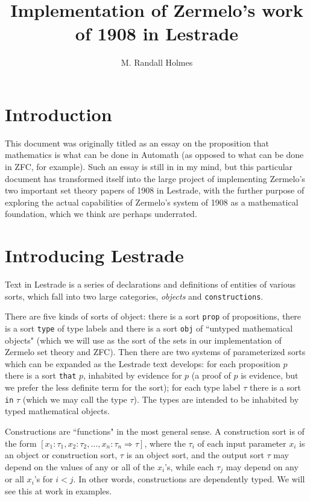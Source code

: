 \documentclass[12pt]{article}
\title{Implementation of Zermelo's work of 1908 in Lestrade}
\author{M. Randall Holmes}
\begin{document}
\maketitle

\section{Introduction}
 
This document was originally titled as an essay on the proposition that mathematics is what can be done in Automath (as opposed to what can be done in ZFC, for example).  Such an essay is still in in my mind, but this particular document has transformed itself into the large project of implementing Zermelo's two important set theory papers of 1908 in Lestrade, with the further purpose of exploring the actual capabilities of Zermelo's system of 1908 as a mathematical foundation, which we think are perhaps underrated.

\section{Introducing Lestrade}

Text in Lestrade is a series of declarations and definitions of entities of various sorts, which fall into two large categories, {\em objects\/} and {\tt constructions\/}.

There are five kinds of sorts of object:  there is a sort {\tt prop} of propositions, there is a sort {\tt type} of type labels and there is a sort {\tt obj} of ``untyped mathematical objects" (which we will use as the sort of the sets in our implementation of Zermelo set theory and ZFC).  Then there are two systems of parameterized sorts which can be expanded as the Lestrade text develops:  for each proposition $p$ there is a sort {\tt that} $p$, inhabited by evidence for $p$ (a proof of $p$ is evidence, but we prefer the less definite term for the sort);  for each type label $\tau$ there is a sort {\tt in} $\tau$ (which we may call the type $\tau$).  The types are intended to be inhabited by typed  mathematical objects.

Constructions are ``functions" in the most general sense.  A construction sort is of the form $[x_1:\tau_1,x_2:\tau_2,\ldots,x_n:\tau_n \Rightarrow \tau]$, where the $\tau_i$ of each input parameter $x_i$  is an object or construction sort, $\tau$ is an object sort, and the output sort $\tau$ may depend on the values of any or all of the $x_i$'s, while each $\tau_j$ may depend on any or all $x_i$'s for $i<j$.  In other words, constructions are dependently typed.  We will see this at work in examples.
\end{document}
